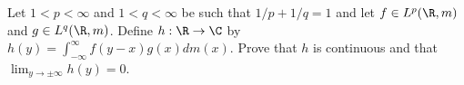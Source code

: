 Let $1<p<\infty$ and $1<q<\infty$ be such that $1/p+1/q=1$ and let
$f\in L^p(\R,m)$ and $g\in L^q(\R,m)$. Define $h:\R\rightarrow \C$ by
$h(y)=\int_{-\infty}^{\infty}f(y-x)g(x)dm(x)$. Prove that $h$ is
continuous and that $\lim_{y\rightarrow \pm\infty}h(y)=0$.
